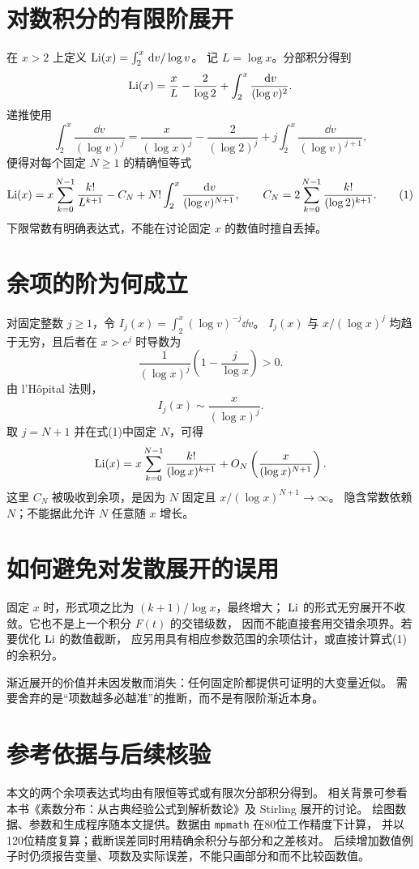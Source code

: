 \documentclass[UTF8,fontset=fandol,11pt]{ctexart}
\begin{document}
\section{对数积分的有限阶展开}
在 $x>2$ 上定义 $\operatorname{Li}(x)=\int_2^x\,\mathrm d v/\log v$。
记 $L=\log x$。分部积分得到
\[
 \operatorname{Li}(x)=\frac{x}{L}-\frac2{\log2}
        +\int_2^x\frac{\,\mathrm d v}{(\log v)^2}.
\]
递推使用
\[
 \int_2^x\frac{\dd v}{(\log v)^j}
 =\frac{x}{(\log x)^j}-\frac2{(\log2)^j}
  +j\int_2^x\frac{\dd v}{(\log v)^{j+1}},
\]
便得对每个固定 $N\ge1$ 的精确恒等式
\[
 \operatorname{Li}(x)=x\sum_{k=0}^{N-1}\frac{k!}{L^{k+1}}
       -C_N+N!\int_2^x\frac{\,\mathrm d v}{(\log v)^{N+1}},
 \qquad
 C_N=2\sum_{k=0}^{N-1}\frac{k!}{(\log2)^{k+1}}.   \tag{1}
\]
下限常数有明确表达式，不能在讨论固定 $x$ 的数值时擅自丢掉。

\section{余项的阶为何成立}
对固定整数 $j\ge1$，令 $I_j(x)=\int_2^x(\log v)^{-j}\dd v$。
$I_j(x)$ 与 $x/(\log x)^j$ 均趋于无穷，且后者在 $x>e^j$ 时导数为
\[
 \frac1{(\log x)^j}\left(1-\frac j{\log x}\right)>0.
\]
由 l'Hôpital 法则，
\[
 I_j(x)\sim \frac{x}{(\log x)^j}.
\]
取 $j=N+1$ 并在式(1)中固定 $N$，可得
\[
 \operatorname{Li}(x)=x\sum_{k=0}^{N-1}\frac{k!}{(\log x)^{k+1}}
       +O_N\left(\frac{x}{(\log x)^{N+1}}\right).
\]
这里 $C_N$ 被吸收到余项，是因为 $N$ 固定且 $x/(\log x)^{N+1}\to\infty$。
隐含常数依赖 $N$；不能据此允许 $N$ 任意随 $x$ 增长。

\section{如何避免对发散展开的误用}
固定 $x$ 时，形式项之比为 $(k+1)/\log x$，最终增大；
$\operatorname{Li}$ 的形式无穷展开不收敛。它也不是上一个积分 $F(t)$ 的交错级数，
因而不能直接套用交错余项界。若要优化 $\operatorname{Li}$ 的数值截断，
应另用具有相应参数范围的余项估计，或直接计算式(1)的余积分。

渐近展开的价值并未因发散而消失：任何固定阶都提供可证明的大变量近似。
需要舍弃的是“项数越多必越准”的推断，而不是有限阶渐近本身。

\section*{参考依据与后续核验}
本文的两个余项表达式均由有限恒等式或有限次分部积分得到。
相关背景可参看本书《素数分布：从古典经验公式到解析数论》及 Stirling 展开的讨论。
绘图数据、参数和生成程序随本文提供。数据由 \texttt{mpmath} 在80位工作精度下计算，
并以120位精度复算；截断误差同时用精确余积分与部分和之差核对。
后续增加数值例子时仍须报告变量、项数及实际误差，不能只画部分和而不比较函数值。
\end{document}
